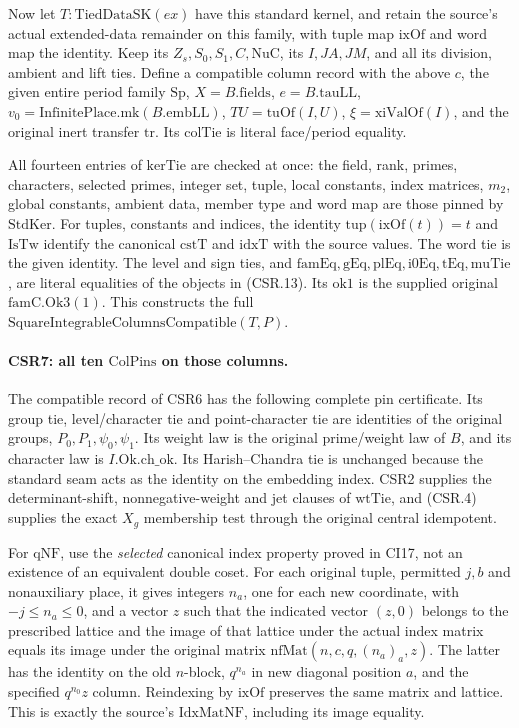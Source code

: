 Now let \(T:\mathrm{TiedDataSK}(ex)\) have this standard kernel,
and retain the source's actual extended-data remainder on this
family, with tuple map \(\mathrm{ixOf}\) and word map the identity.
Keep its \(Z_s,S_0,S_1,C,\mathrm{NuC}\), its \(I,JA,JM\), and all its
division, ambient and lift ties. Define a compatible column
record with the above \(c\), the given entire period family
\(\mathrm{Sp}\), \(X=B.\mathrm{fields}\), \(e=B.\mathrm{tauLL}\),
\(v_0=\mathrm{InfinitePlace.mk}(B.\mathrm{embLL})\),
\(TU=\mathrm{tuOf}(I,U)\), \(\xi=\mathrm{xiValOf}(I)\), and the
original inert transfer \(\mathrm{tr}\).
Its \(\mathrm{colTie}\) is literal face/period equality.

All fourteen entries of \(\mathrm{kerTie}\) are checked at once:
the field, rank, primes, characters, selected primes, integer set,
tuple, local constants, index matrices, \(m_2\), global constants,
ambient data, member type and word map are those pinned by
\(\mathrm{StdKer}\). For tuples, constants and indices, the
identity \(\mathrm{tup}(\mathrm{ixOf}(t))=t\) and
\(\mathrm{IsTw}\) identify the canonical \(\mathrm{cstT}\) and
\(\mathrm{idxT}\) with the source values. The word tie is the
given identity. The level and sign ties, and
\(\mathrm{famEq,gEq,plEq,i0Eq,tEq,muTie}\), are literal equalities
of the objects in (CSR.13). Its \(\mathrm{ok1}\) is the supplied
original \(\mathrm{famC.Ok3}(1)\). This constructs the full
\(\mathrm{SquareIntegrableColumnsCompatible}(T,P)\).

\paragraph{CSR7: all ten \(\mathrm{ColPins}\) on those columns.}
\label{claim:CSR7}
The compatible record of CSR6 has the following complete pin
certificate. Its group tie, level/character tie and point-character
tie are identities of the original groups, \(P_0,P_1,\psi_0,\psi_1\).
Its weight law is the original prime/weight law of \(B\), and its
character law is \(I.\mathrm{Ok.ch\_ok}\). Its Harish--Chandra
tie is unchanged because the standard seam acts as the identity
on the embedding index. CSR2 supplies the determinant-shift,
nonnegative-weight and jet clauses of \(\mathrm{wtTie}\), and
(CSR.4) supplies the exact \(X_g\) membership test through the
original central idempotent.

For \(\mathrm{qNF}\), use the \emph{selected} canonical index
property proved in CI17, not an existence of an equivalent
double coset. For each original tuple, permitted \(j,b\) and
nonauxiliary place, it gives integers \(n_a\), one for each new
coordinate, with \(-j\le n_a\le0\), and a vector \(z\) such that
the indicated vector \((z,0)\) belongs to
the prescribed lattice and the image of that lattice under the
actual index matrix equals its image under the original matrix
\(\mathrm{nfMat}(n,c,q,(n_a)_a,z)\). The latter has the identity on
the old \(n\)-block, \(q^{n_a}\) in new diagonal position \(a\), and the
specified \(q^{n_0}z\) column. Reindexing by
\(\mathrm{ixOf}\) preserves the same matrix and lattice.
This is exactly the source's \(\mathrm{IdxMatNF}\), including
its image equality.

